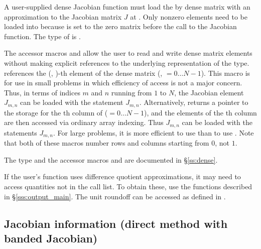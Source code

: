 {
  A user-supplied dense Jacobian function must load the  by 
  dense matrix  with an approximation to the Jacobian matrix $J$ at .
  Only nonzero elements need to be loaded
  into  because  is set to the zero matrix before the call
  to the Jacobian function. The type of  is . 
  
  The accessor macros  and  allow the user to
  read and write dense matrix elements without making explicit
  references to the underlying representation of the 
  type.  references the (, )-th
  element of the dense matrix  (, $= 0\ldots N-1$). This macro
  is for use in small problems in which efficiency of access is not a major
  concern.  Thus, in terms of indices $m$ and $n$ running from $1$ to
  $N$, the Jacobian element $J_{m,n}$ can be loaded with the statement
   $J_{m,n}$.  Alternatively,
   returns a pointer to the storage for
  the th column of  ($= 0\ldots N-1$), and the 
  elements of the th column
  are then accessed via ordinary array indexing.  Thus $J_{m,n}$ can be 
  loaded with the statements 
   $J_{m,n}$.  For large problems, it is more 
  efficient to use  than to use . 
  Note that both of these macros number rows and columns
  starting from $0$, not $1$.  

  The  type and the accessor macros  and 
   are documented in \S\ref{ss:dense}.

  If the user's  function uses difference quotient
  approximations, it may need to access quantities not in the call
  list. To obtain these, use the  functions described in
  \S\ref{sss:output_main}. The unit roundoff can be accessed
  as  defined in .
}

\subsection{Jacobian information (direct method with banded Jacobian)}
\label{ss:bjacFn}

